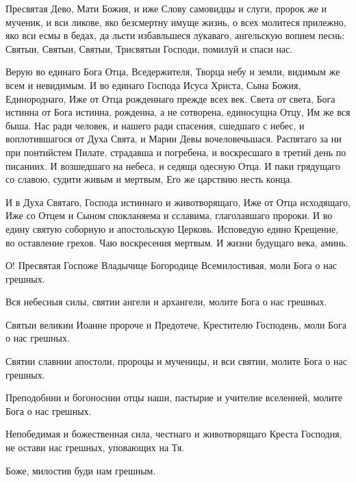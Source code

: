 \begin{mymulticols}
Пресвятая Дево, Мати Божия, и иже Слову самовидцы и слуги, пророк же и мученик, и вси ликове, яко безсмертну имуще жизнь, о всех молитеся прилежно, яко вси есмы в бедах, да льсти избавльшеся лукаваго, ангельскую вопием песнь: Святыи, Святыи, Святыи, Трисвятыи Господи, помилуй и спаси нас. 


Верую во единаго Бога Отца, Вседержителя, Творца небу и земли, видимым же всем и невидимым. И во единаго Господа Исуса Христа, Сына Божия, Единороднаго, Иже от Отца рожденнаго прежде всех век. Света от света, Бога истинна от Бога истинна, рожденна, а не сотворена, единосущна Отцу, Им же вся быша. Нас ради человек, и нашего ради спасения, сшедшаго с небес, и воплотившагося от Духа Свята, и Марии Девы вочеловечьшася. Распятаго за ни при понтийстем Пилате, страдавша и погребена, и воскресшаго в третий день по писаниих. И возшедшаго на небеса, и седяща одесную Отца. И паки грядущаго со славою, судити живым и мертвым, Его же царствию несть конца.

 И в Духа Святаго, Господа истиннаго и животворящаго, Иже от Отца исходящаго, Иже со Отцем и Сыном спокланяема и сславима, глаголавшаго пророки. И во едину святую соборную и апостольскую Церковь. Исповедую едино Крещение, во оставление грехов. Чаю воскресения мертвым. И жизни будущаго века, аминь.


О! Пресвятая Госпоже Владычице Богородице Всемилостивая, моли Бога о нас грешных. 


Вся небесныя силы, святии ангели и архангели, молите Бога о нас грешных.

Святыи великии Иоанне пророче и Предотече, Крестителю Господень, моли Бога о нас грешных.

Святии славнии апостоли, пророцы и мученицы, и вси святии, молите Бога о нас грешных.

Преподобнии и богоноснии отцы наши, пастырие и учителие вселенней, молите Бога о нас грешных.


Непобедимая и божественная сила, честнаго и животворящаго Креста Господня, не остави нас грешных, уповающих на Тя. 

Боже, милостив буди нам грешным. 


\end{mymulticols}
